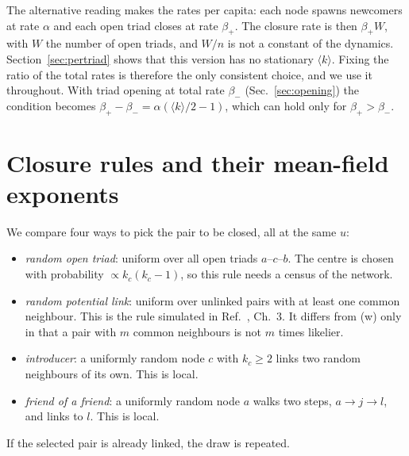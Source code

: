 \documentclass[aps,pre,twocolumn,superscriptaddress,floatfix,nofootinbib]{revtex4-2}
\begin{document}
The alternative reading makes the rates per capita: each node spawns newcomers
at rate $\alpha$ and each open triad closes at rate $\beta_+$. The closure rate is
then $\beta_+ W$, with $W$ the number of open triads, and $W/n$ is not a
constant of the dynamics. Section~\ref{sec:pertriad} shows that this version has
no stationary $\langle k\rangle$. Fixing the ratio of the total rates is
therefore the only consistent choice, and we use it throughout. With triad
opening at total rate $\beta_-$ (Sec.~\ref{sec:opening}) the condition becomes
$\beta_+-\beta_-=\alpha(\langle k\rangle/2-1)$, which can hold only for
$\beta_+>\beta_-$.

\section{Closure rules and their mean-field exponents}
\label{sec:normal}

We compare four ways to pick the pair to be closed, all at the same $u$:
\begin{itemize}
\item[(w)] \emph{random open triad}: uniform over all open triads $a$--$c$--$b$.
  The centre is chosen with probability $\propto k_c(k_c-1)$, so this rule
  needs a census of the network.
\item[(p)] \emph{random potential link}: uniform over unlinked pairs with at
  least one common neighbour. This is the rule simulated in
  Ref.~\cite{book}, Ch.~3. It differs from (w) only in that a pair with $m$
  common neighbours is not $m$ times likelier.
\item[(c)] \emph{introducer}: a uniformly random node $c$ with $k_c\ge 2$ links
  two random neighbours of its own. This is local.
\item[(f)] \emph{friend of a friend}: a uniformly random node $a$ walks two steps,
  $a\to j\to l$, and links to $l$. This is local.
\end{itemize}
If the selected pair is already linked, the draw is repeated.
\end{document}
